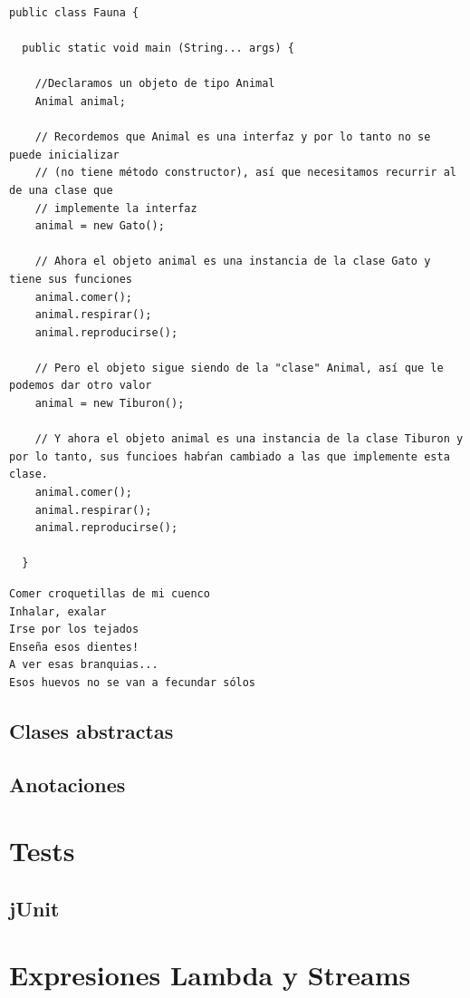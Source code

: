 \documentclass[11pt]{article}
\begin{document}
\begin{verbatim}
public class Fauna {

  public static void main (String... args) {

    //Declaramos un objeto de tipo Animal
    Animal animal;

    // Recordemos que Animal es una interfaz y por lo tanto no se puede inicializar
    // (no tiene método constructor), así que necesitamos recurrir al de una clase que
    // implemente la interfaz
    animal = new Gato();

    // Ahora el objeto animal es una instancia de la clase Gato y tiene sus funciones
    animal.comer();
    animal.respirar();
    animal.reproducirse();

    // Pero el objeto sigue siendo de la "clase" Animal, así que le podemos dar otro valor
    animal = new Tiburon();

    // Y ahora el objeto animal es una instancia de la clase Tiburon y por lo tanto, sus funcioes habŕan cambiado a las que implemente esta clase.
    animal.comer();
    animal.respirar();
    animal.reproducirse();

  }
\end{verbatim}

\begin{verbatim}
Comer croquetillas de mi cuenco
Inhalar, exalar
Irse por los tejados
Enseña esos dientes!
A ver esas branquias...
Esos huevos no se van a fecundar sólos
\end{verbatim}

\subsection{Clases abstractas}
\label{sec:org77b1844}
\subsection{Anotaciones}
\label{sec:org9534521}
\section{Tests}
\label{sec:orga995d9a}
\subsection{jUnit}
\label{sec:orga5ccaf7}
\section{Expresiones Lambda y Streams}
\label{sec:orga612df0}
\end{document}
